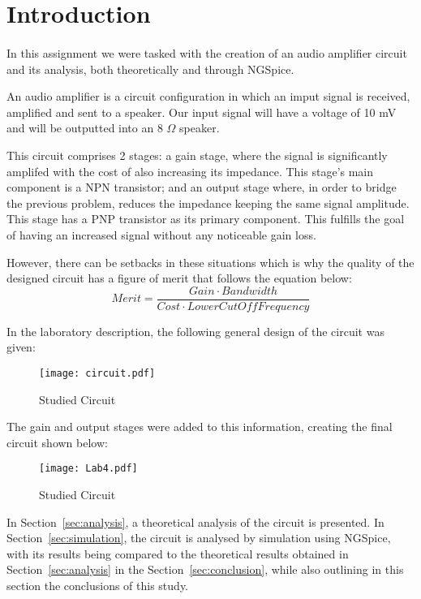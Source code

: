 \section{Introduction}
\label{sec:introduction}
\paragraph{}
\par In this assignment we were tasked with the creation of an audio amplifier circuit and its analysis, both theoretically and through NGSpice.
\par An audio amplifier is a circuit configuration in which an imput signal is received, amplified and sent to a speaker. Our input signal will have a voltage of 10 mV and will be outputted into an 8 $\Omega$ speaker.
\par This circuit comprises 2 stages: a gain stage, where the signal is significantly amplifed with the cost of also increasing its impedance. This stage's main component is a NPN transistor; and an output stage where, in order to bridge the previous problem, reduces the impedance keeping the same signal amplitude. This stage has a PNP transistor as its primary component. This fulfills the goal of having an increased signal without any noticeable gain loss.
\par However, there can be setbacks in these situations which is why the quality of the designed circuit has a figure of merit that follows the equation below:
\[Merit=\frac{Gain \cdot Bandwidth}{Cost \cdot LowerCutOffFrequency}\]
\par In the laboratory description, the following general design of the circuit was given:

\begin{figure}[H]
    \texttt{[image: circuit.pdf]}
    \centering
    \caption{Studied Circuit}
    \label{circuit}
\end{figure}


\par The gain and output stages were added to this information, creating the final circuit shown below: 

\begin{figure}[H]
    \texttt{[image: Lab4.pdf]}
    \centering
    \caption{Studied Circuit}
    \label{circuit}
\end{figure}

\par In Section~\ref{sec:analysis}, a theoretical analysis of the circuit is
presented. In Section~\ref{sec:simulation}, the circuit is analysed by
simulation using NGSpice, with its results being compared to the theoretical results obtained in
Section~\ref{sec:analysis} in the Section~\ref{sec:conclusion}, while also outlining in this section the conclusions of this study.	
